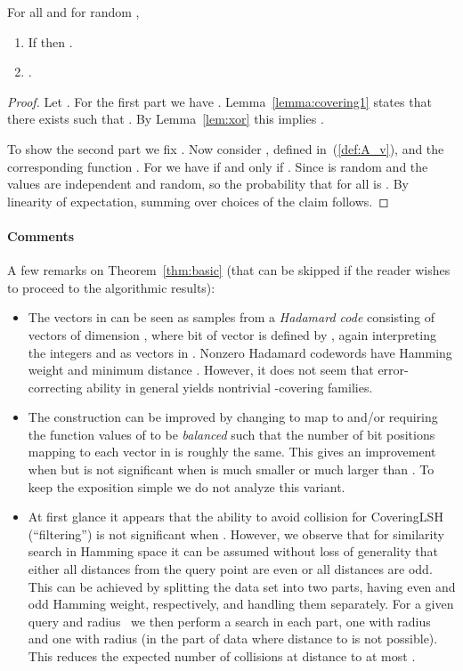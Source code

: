 \documentclass[prodmode,acmtalg]{acmsmall}
\begin{document}
\begin{theorem}\label{thm:basic}
	For all  and for random ,
	\begin{enumerate}
\item If  then .
\item .
\end{enumerate}
\end{theorem}
\begin{proof}
Let .
For the first part we have .
Lemma~\ref{lemma:covering1} states that there exists 
 such that .
By Lemma~\ref{lem:xor} this implies .

To show the second part we fix .
Now consider , defined in~(\ref{def:A_v}), and the corresponding function .
For  we have  if and only if .
Since  is random and  the  values are independent and random, so the probability that  for all  is .
By linearity of expectation, summing over  choices of  the claim follows. 
\end{proof}

\paragraph{Comments} A few remarks on Theorem~\ref{thm:basic} (that can be skipped if the reader wishes to proceed to the algorithmic results):
\begin{itemize}
\item The vectors in  can be seen as samples from a \emph{Hadamard code} consisting of  vectors of dimension , where bit  of vector  is defined by , again interpreting the integers  and  as vectors in .
Nonzero Hadamard codewords have Hamming weight and minimum distance .
However, it does not seem that error-correcting ability in general yields nontrivial -covering families.

\item The construction can be improved by changing  to map to  and/or requiring the function values of  to be \emph{balanced} such that the number of bit positions mapping to each vector in  is roughly the same.
This gives an improvement when  but is not significant when  is much smaller or much larger than .
To keep the exposition simple we do not analyze this variant.
\item At first glance it appears that the ability to avoid collision for CoveringLSH (``filtering'') is not significant when .
However, we observe that for similarity search in Hamming space it can be assumed without loss of generality that either all distances from the query point are even or all distances are odd.
This can be achieved by splitting the data set into two parts, having even and odd Hamming weight, respectively, and handling them separately.
For a given query  and radius~ we then perform a search in each part, one with radius~ and one with radius  (in the part of data where distance  to  is not possible).
This reduces the expected number of collisions at distance  to at most . 
\end{itemize}
\end{document}
